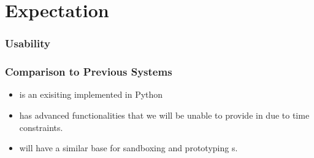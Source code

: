 
\section{Expectation}

\frame{\sectionpage}


\begin{frame} %
\frametitle{Usability}
\end{frame}

\begin{frame}
\frametitle{Comparison to Previous Systems}

  \begin{itemize}
  \item \charm{} is an exisiting \cf implemented in Python
  \item \charm{} has advanced functionalities
    that we will be unable to provide in \cry{}
    due to time constraints.
  \item \cry{} will have a similar base for sandboxing
    and prototyping \cs s.
  \end{itemize}

\end{frame}

